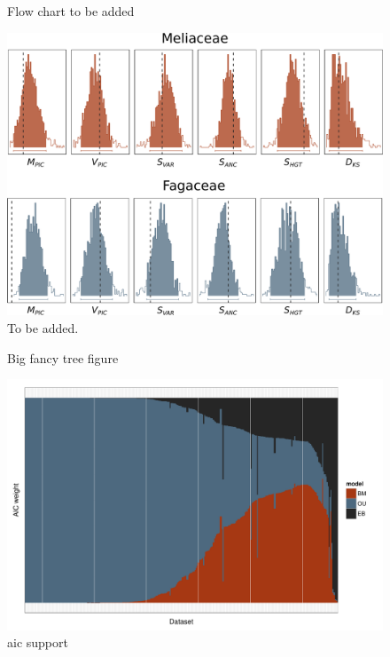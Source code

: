 \documentclass[a4paper,12pt]{article}
\begin{document}
\begin{figure}[p]
  \centering
  \caption{Flow chart to be added}
  \label{fig:flowchart}
\end{figure}

\begin{figure}[p]
  \centering
  \includegraphics[scale=0.65]{figs/two-clade-example}
  \caption{To be added.}
  \label{fig:two-clades}
\end{figure}

\begin{figure}[p]
  \centering
  \caption{Big fancy tree figure}
  \label{fig:angio-phylogeny}
\end{figure}

\begin{figure}[p]
  \centering
  \includegraphics[scale=0.7]{figs/AIC-support}
  \caption{aic support}
  \label{fig:aic-support}
\end{figure}
\end{document}
